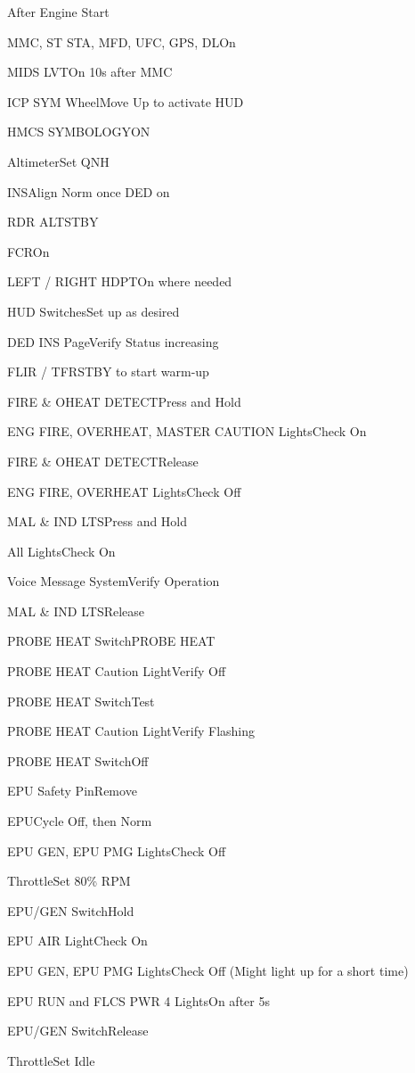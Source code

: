 \documentclass[sim-use]{checklist}
\begin{document}
\begin{checklist}{After Engine Start}
	 {
		\item{MMC, ST STA, MFD, UFC, GPS, DL}{On}
		\item{MIDS LVT}{On 10s after MMC}
		\item{ICP SYM Wheel}{Move Up to activate HUD}
		\item{HMCS SYMBOLOGY}{ON}
		\item{Altimeter}{Set QNH}
		\item{INS}{Align Norm once DED on}
		\item{RDR ALT}{STBY}
		\item{FCR}{On}
		\item{LEFT / RIGHT HDPT}{On where needed}
		\item{HUD Switches}{Set up as desired}
		\item{DED INS Page}{Verify Status increasing}
		\item{FLIR / TFR}{STBY to start warm-up}
	}
	 {
		\item{FIRE \& OHEAT DETECT}{Press and Hold}
		\item{ENG FIRE, OVERHEAT, MASTER CAUTION Lights}{Check On}
		\item{FIRE \& OHEAT DETECT}{Release}
		\item{ENG FIRE, OVERHEAT Lights}{Check Off}
	}
	 {
		\item{MAL \& IND LTS}{Press and Hold}
		\item{All Lights}{Check On}
		\item{Voice Message System}{Verify Operation}
		\item{MAL \& IND LTS}{Release}
	}
	 {
		\item{PROBE HEAT Switch}{PROBE HEAT}
		\item{PROBE HEAT Caution Light}{Verify Off}
		\item{PROBE HEAT Switch}{Test}
		\item{PROBE HEAT Caution Light}{Verify Flashing}
		\item{PROBE HEAT Switch}{Off}
	}
\end{checklist}

\begin{continuedchecklist}
	 {
		\item{EPU Safety Pin}{Remove}
		\item{EPU}{Cycle Off, then Norm}
		\item{EPU GEN, EPU PMG Lights}{Check Off}
		\item{Throttle}{Set 80\% RPM}
		\item{EPU/GEN Switch}{Hold}
		\item{EPU AIR Light}{Check On}
		\item{EPU GEN, EPU PMG Lights}{Check Off (Might light up for a short time)}
		\item{EPU RUN and FLCS PWR 4 Lights}{On after 5s}
		\item{EPU/GEN Switch}{Release}
		\item{Throttle}{Set Idle}
	}
\end{continuedchecklist}
\end{document}
